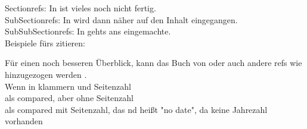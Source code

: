 Sectionrefs: In  ist vieles noch nicht fertig. \\
SubSectionrefs: In  wird dann näher auf den Inhalt eingegangen.\\
SubSubSectionrefs: In  gehts ans eingemachte.\\

Beispiele fürs zitieren:

Für einen noch besseren Überblick, kann das Buch von \citet{Butler2017} oder auch andere refs wie \citet{CS231nCNN} hinzugezogen werden \citep{Deeplearning4j2017}.\\
Wenn in klammern und Seitenzahl \citep[p. 3]{Butler2017}\\

als compared, aber ohne Seitenzahl \citep[cmp.][]{Butler2017} \\
als compared mit Seitenzahl, das nd heißt "no date", da keine Jahrezahl vorhanden \citep[cmp.][p. 5]{Wang} \\

%
